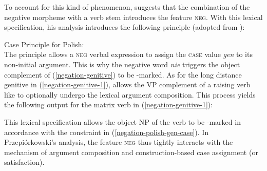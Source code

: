 \documentclass[output=paper
	        ,collection
	        ,collectionchapter
 	        ,biblatex
                ,babelshorthands
                ,newtxmath
                ,draftmode
                ,colorlinks, citecolor=brown
]{langscibook}
\begin{document}
{\begin{exe}
\begin{xlist}
\iffalse{
\eal
\ex \label{negation-genitive-1}
\gll Pisz\c{e} listy /*list\'{o}w.
     write.1\textsc{sg} letters.\textsc{acc}/letters.\textsc{gen}\\
\glt `I am writing letters.'

\ex
\gll Nie chcialem   pisa\'{c} list\'{o}w. \\
     \textsc{neg} wanted.1\sg.\mas{} write.\textsc{inf} letters.\textsc{gen}\\
\glt `I didn't want to write letters.'
\zl}\fi
To account for this kind of phenomenon, \citet{Prz:00}
suggests that the combination of the
negative morpheme  with a verb stem introduces the
feature \textsc{neg}.
  With this lexical specification, his analysis introduces
 the following principle (adopted from \citealt[]{Prz:00}):

\ea
\label{negation-polish-gen-case}
Case Principle for Polish:\\
  \impl
{}
\z
The principle allows a \textsc{neg} verbal expression to assign
 the \textsc{case} value \textit{gen} to its non-initial argument.
%
This is why the negative word \textit{nie} triggers
 the object complement of
(\ref{negation-genitive}) to be \GEN-marked.
As for the long distance genitive in (\ref{negation-genitive-1}), \citet[]{Prz:00}
allows the VP complement of a raising verb like  to optionally undergo the lexical
argument composition. This process yields the following output for the
matrix verb in (\ref{negation-genitive-1}):

\ea
\label{negation-polish-case}
\z
%
This lexical specification allows the object NP of the verb to be
\GEN-marked in accordance with the constraint in (\ref{negation-polish-gen-case}).
In Przepiórkowski's analysis, the feature
\textsc{neg} thus tightly interacts with the mechanism of argument composition and construction-based case assignment (or satisfaction).


\end{xlist}
\end{exe}}
\end{document}
